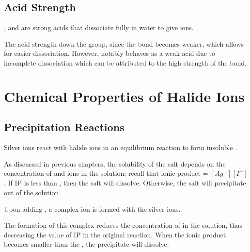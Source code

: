 

		\subsection{Acid Strength}

			,  and  are strong acids that dissociate fully in water to give  ions.

			The acid strength  down the group, since the  bond becomes weaker, which allows for easier
			dissociation. However,  notably behaves as a weak acid due to incomplete dissociation which can be attributed to the
			high strength of the  bond.



	\section{Chemical Properties of Halide Ions}

		\subsection{Precipitation Reactions}

			Silver ions react with halide ions in an equilibrium reaction to form insoluble .


			As discussed in previous chapters, the solubility of the  salt depends on the concentration of  and  ions
			in the solution; recall that ionic product = $[Ag^{+}][I^{-}]$. If IP is less than \Ksp{}, then the salt will dissolve. Otherwise,
			the salt will precipitate out of the solution.

			Upon adding , a complex ion is formed with the silver ions.


			The formation of this complex reduces the concentration of  in the solution, thus decreasing the value of IP in the original
			reaction. When the ionic product becomes smaller than the \Ksp{}, the precipitate will dissolve.

